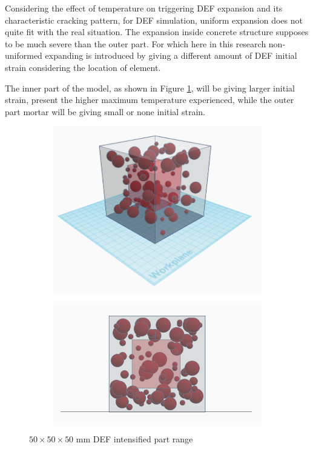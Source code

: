 Considering the effect of temperature on triggering  DEF expansion and its characteristic cracking pattern, for DEF simulation, uniform expansion does not quite fit with the real situation. The expansion inside concrete structure supposes to be much severe than the outer part. For which here in this research non-uniformed expanding is introduced by giving a different amount of DEF initial strain considering the location of element.


The inner part of the model, as shown in Figure \ref{fig:non-uniform DEF}, will be giving larger initial strain,  present the higher maximum temperature experienced, while the outer part mortar will be giving small or none initial strain.

\begin{figure}[ht]
\centering
    \begin{subfigure}{.33\textwidth}
      \centering
      \includegraphics[width=.8\linewidth]{Files/DEF_X/X0_3d.png}
    \end{subfigure}%
    \begin{subfigure}{.33\textwidth}
      \centering
      \includegraphics[width=.8\linewidth]{Files/DEF_X/X0_3ds.png}
    \end{subfigure}
  \caption{$50 \times 50 \times 50$ mm DEF intensified part range}
  \label{fig:non-uniform DEF}
  \end{figure}


